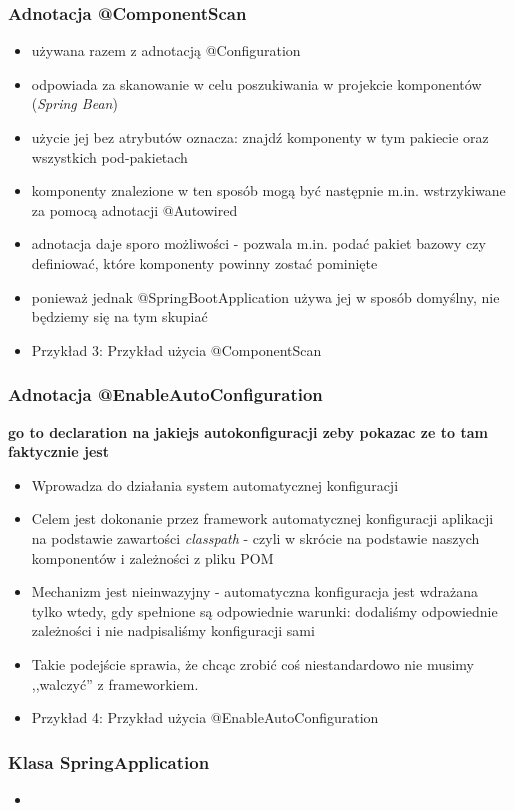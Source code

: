\documentclass{beamer}
\begin{document}
\begin{frame}
\frametitle{Adnotacja @ComponentScan}
\begin{itemize}
\item używana razem z adnotacją @Configuration
\item odpowiada za skanowanie w celu poszukiwania w projekcie komponentów (\textit{Spring Bean})
\item użycie jej bez atrybutów oznacza: znajdź komponenty w tym pakiecie oraz wszystkich pod-pakietach
\item komponenty znalezione w ten sposób mogą być następnie m.in. wstrzykiwane za pomocą adnotacji @Autowired
\item adnotacja daje sporo możliwości - pozwala m.in. podać pakiet bazowy czy definiować, które komponenty powinny zostać pominięte
\item ponieważ jednak @SpringBootApplication używa jej w sposób domyślny, nie będziemy się na tym skupiać
\item Przykład 3: Przykład użycia @ComponentScan
\end{itemize}
\end{frame}

\begin{frame}
\frametitle{Adnotacja @EnableAutoConfiguration}
\textbf{go to declaration na jakiejs autokonfiguracji zeby pokazac ze to tam faktycznie jest}
\begin{itemize}
\item Wprowadza do działania system automatycznej konfiguracji
\item Celem jest dokonanie przez framework automatycznej konfiguracji aplikacji na podstawie zawartości \textit{classpath} - czyli w skrócie na podstawie naszych komponentów i zależności z pliku POM
\item Mechanizm jest nieinwazyjny - automatyczna konfiguracja jest wdrażana tylko wtedy, gdy spełnione są odpowiednie warunki: dodaliśmy odpowiednie zależności i nie nadpisaliśmy konfiguracji sami
\item Takie podejście sprawia, że chcąc zrobić coś niestandardowo nie musimy ,,walczyć'' z frameworkiem.
\item Przykład 4: Przykład użycia @EnableAutoConfiguration
\end{itemize}
\end{frame}

\begin{frame}
\frametitle{Klasa SpringApplication}
\begin{itemize}
\item 
\end{itemize}
\end{frame}
\end{document}
